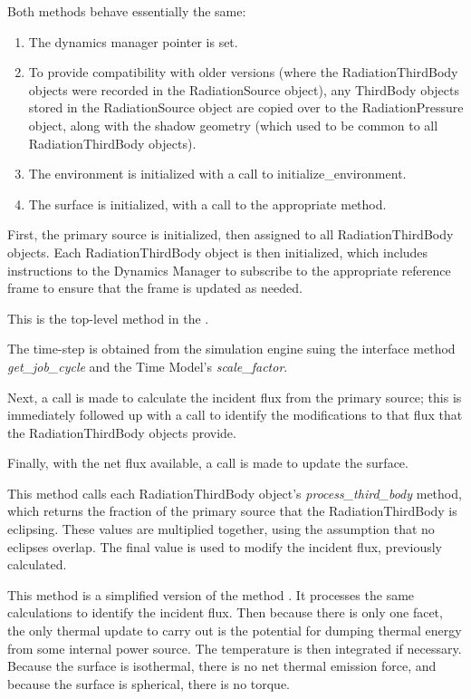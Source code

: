{\begin{enumerate}
{\begin{enumerate}
Both methods behave essentially the same:
\begin{enumerate}
 \item The dynamics manager pointer is set.
 \item To provide compatibility with older versions (where the
 RadiationThirdBody objects were recorded in the RadiationSource object), any
 ThirdBody objects stored in the RadiationSource object are copied over to the
 RadiationPressure object, along with the shadow geometry (which used to be
 common to all RadiationThirdBody objects).
 \item The environment is initialized with a call to initialize\_environment.
 \item The surface is initialized, with a call to the appropriate method.
\end{enumerate}


First, the primary source is initialized, then assigned to all
RadiationThirdBody objects.  Each RadiationThirdBody object is then
initialized, which includes instructions to the Dynamics Manager to subscribe
to the appropriate reference frame to ensure that the frame is updated as
needed.

This is the top-level method in the \RadiationPressureDesc.

The time-step is obtained from the simulation engine suing the interface method
\textit{get\_job\_cycle} and the Time Model's \textit{scale\_factor}.

Next, a call is made to calculate the incident flux from the primary source;
this is immediately followed up with a call to identify the modifications to
that flux that the RadiationThirdBody objects provide.

Finally, with the net flux available, a call is made to update the surface.

This method calls each RadiationThirdBody object's
\textit{process\_third\_body} method, which returns the fraction of the primary
source that the RadiationThirdBody is eclipsing.  These values are multiplied
together, using the assumption that no eclipses overlap.  The final value is
used to modify the incident flux, previously calculated.


This method is a simplified version of the method
.  It processes the
same calculations to identify the incident flux.  Then because there is only
one facet, the only thermal update to carry out is the potential for dumping
thermal energy from some internal power source.  The temperature is then
integrated if necessary.  Because the surface is isothermal, there is no net
thermal emission force, and because the surface is spherical, there is no
torque.



\end{enumerate}}
\end{enumerate}}
